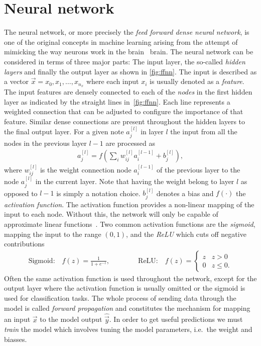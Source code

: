 \section{Neural network}\label{sec:NN}
The neural network, or more precisely the \textit{feed forward dense neural
network}, is one of the original concepts in machine learning arising from the attempt of mimicking the way neurons work in the brain~\cite{lederer2021activation, Shankar_2022} brain. The neural network can be considered in terms of three major parts: The input layer, the
so-called \textit{hidden layers} and finally the output layer as shown in
\cref{fig:ffnn}. The input is described as a vector $\vec{x} = x_0, x_1, \ldots,
x_{n_x}$ where each input $x_i$ is usually denoted as a \textit{feature}. The
input features are densely connected to each of the \textit{nodes} in the first
hidden layer as indicated by the straight lines in~\cref{fig:ffnn}. Each line
represents a weighted connection that can be adjusted to configure the
importance of that feature. Similar dense connections are present throughout the
hidden layers to the final output layer. For a given note $a_j^{[l]}$ in layer $l$ the input from all the nodes in the previous layer $l-1$ are processed as
\begin{align*}
  a_j^{[l]} = f\left(\sum_i w^{[l]}_{ij}a_i^{[l-1]} + b_j^{[l]}\right),
\end{align*}
where $w^{[l]}_{ij}$ is the weight connection node $a_i^{[l-1]}$ of the previous layer to the node $a_j^{[l]}$ in the current layer. Note that having the weight belong to layer $l$ as opposed to $l-1$ is simply a notation choice. $b_j^{[l]}$ denotes a bias and $f(\cdot)$ the \textit{activation function}. The activation function provides a non-linear mapping of the input to each node. Without this, the network will only be capable of approximate linear functions~\cite{lederer2021activation}. Two common activation functions are the \textit{sigmoid}, mapping the input to the range $(0,1)$, and the \textit{ReLU} which cuts off negative contributions
\begin{align*}
  \text{Sigmoid:} \quad f(z) = \frac{1}{1 + e^{-z}}, \qquad \qquad
  \text{ReLU:} \quad 
  f(z)= \begin{cases}
    z & z > 0   \\
    0 & z \leq 0.
    \end{cases}
\end{align*}
Often the same activation function is used throughout the network, except for the output layer where the activation function is usually omitted or the sigmoid is used for classification tasks. The whole process of sending data through the model is called \textit{forward propagation} and constitutes the mechanism for mapping an input $\vec{x}$ to the model output $\hat{\vec{y}}$. In order to get useful predictions we must \textit{train} the model which involves tuning the model parameters, i.e.\ the weight and biasses.
